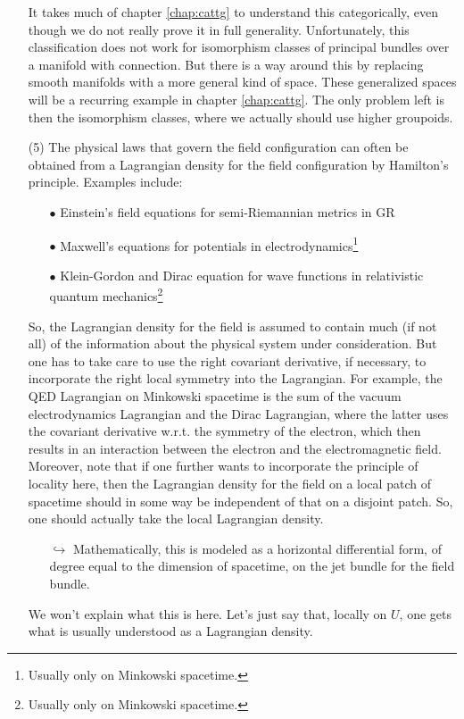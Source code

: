 \begin{enumerate}
It takes much of chapter \ref{chap:cattg} to understand this categorically, even though we do not really prove it in full generality.
Unfortunately, this classification does not work for isomorphism classes of principal bundles over a manifold with connection.
But there is a way around this by replacing smooth manifolds with a more general kind of space.
These generalized spaces will be a recurring example in chapter \ref{chap:cattg}.
The only problem left is then the isomorphism classes, where we actually should use higher groupoids.
\item[(5)]
The physical laws that govern the field configuration can often be obtained from a Lagrangian density for the field configuration by Hamilton's principle.
Examples include:
\begin{enumerate}
\item[$\bullet$]
Einstein's field equations for semi-Riemannian metrics in GR
\item[$\bullet$]
Maxwell's equations for potentials in electrodynamics\footnote{Usually only on Minkowski spacetime.}
\item[$\bullet$]
Klein-Gordon and Dirac equation for wave functions in relativistic quantum mechanics\footnote{Usually only on Minkowski spacetime.}
\end{enumerate}
So, the Lagrangian density for the field is assumed to contain much (if not all) of the information about the physical system under consideration.
But one has to take care to use the right covariant derivative, if necessary, to incorporate the right local symmetry into the Lagrangian.
For example, the QED Lagrangian on Minkowski spacetime is the sum of the vacuum electrodynamics Lagrangian and the Dirac Lagrangian, where the latter uses the covariant derivative w.r.t. the symmetry of the electron, which then results in an interaction between the electron and the electromagnetic field.
Moreover, note that if one further wants to incorporate the principle of locality here, then the Lagrangian density for the field on a local patch of spacetime should in some way be independent of that on a disjoint patch.
So, one should actually take the local Lagrangian density.
\begin{enumerate}
\item[$\pmb{\hookrightarrow}$]
Mathematically, this is modeled as a horizontal differential form, of degree equal to the dimension of spacetime, on the jet bundle for the field bundle.
\end{enumerate}
We won't explain what this is here.
Let's just say that, locally on $U$, one gets what is usually understood as a Lagrangian density.
\end{enumerate}
